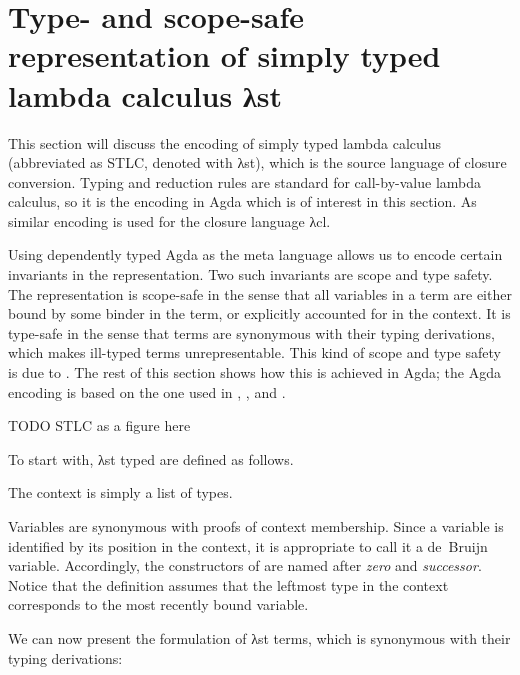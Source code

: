 \documentclass[bsc,frontabs,oneside,singlespacing,parskip,deptreport]{infthesis}
\theoremstyle{definition}
\theoremstyle{lemma}
\begin{document}
\section{Type- and scope-safe representation of simply typed lambda
  calculus λst}

This section will discuss the encoding of simply typed lambda calculus
(abbreviated as STLC, denoted with λst), which is the source language
of closure conversion. Typing and reduction rules are standard for
call-by-value lambda calculus, so it is the encoding in Agda which is
of interest in this section. As similar encoding is used for the
closure language λcl.

Using dependently typed Agda as the meta language allows us to encode
certain invariants in the representation. Two such invariants are
scope and type safety. The representation is scope-safe in the sense
that all variables in a term are either bound by some binder in the
term, or explicitly accounted for in the context. It is type-safe in
the sense that terms are synonymous with their typing derivations,
which makes ill-typed terms unrepresentable. This kind of scope and
type safety is due to \cite{DBLP:conf/csl/AltenkirchR99}. The rest of
this section shows how this is achieved in Agda; the Agda encoding is
based on the one used in \cite{DBLP:conf/cpp/Allais0MM17},
\cite{DBLP:journals/pacmpl/AllaisA0MM18}, and
\cite{DBLP:conf/sbmf/Wadler18}.

TODO STLC as a figure here

To start with, λst typed are defined as follows.


The context is simply a list of types.


Variables are synonymous with proofs of context membership. Since a
variable is identified by its position in the context, it is
appropriate to call it a de~Bruijn variable. Accordingly, the
constructors of  are named after \textit{zero} and
\textit{successor}. Notice that the definition assumes that the
leftmost type in the context corresponds to the most recently bound
variable.


We can now present the formulation of λst terms, which is synonymous
with their typing derivations:

\end{document}
